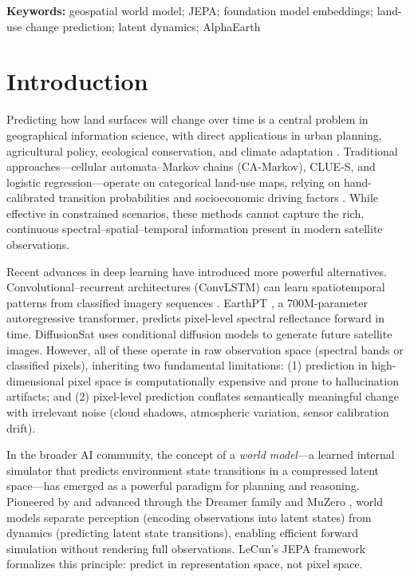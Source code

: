 \documentclass{article}
\newenvironment{keywords}{\par\noindent\textbf{Keywords:} }{\par}
\begin{document}
\begin{keywords}
geospatial world model; JEPA; foundation model embeddings; land-use change prediction; latent dynamics; AlphaEarth
\end{keywords}

\section{Introduction}
\label{sec:intro}

Predicting how land surfaces will change over time is a central problem in geographical information science, with direct applications in urban planning, agricultural policy, ecological conservation, and climate adaptation \citep{verburg2004lulc}. Traditional approaches---cellular automata--Markov chains (CA-Markov), CLUE-S, and logistic regression---operate on categorical land-use maps, relying on hand-calibrated transition probabilities and socioeconomic driving factors \citep{veldkamp2004clues}. While effective in constrained scenarios, these methods cannot capture the rich, continuous spectral--spatial--temporal information present in modern satellite observations.

Recent advances in deep learning have introduced more powerful alternatives. Convolutional--recurrent architectures (ConvLSTM) can learn spatiotemporal patterns from classified imagery sequences \citep{shi2015convlstm}. EarthPT \citep{smith2023earthpt}, a 700M-parameter autoregressive transformer, predicts pixel-level spectral reflectance forward in time. DiffusionSat \citep{khanna2023diffusionsat} uses conditional diffusion models to generate future satellite images. However, all of these operate in raw observation space (spectral bands or classified pixels), inheriting two fundamental limitations: (1) prediction in high-dimensional pixel space is computationally expensive and prone to hallucination artifacts; and (2) pixel-level prediction conflates semantically meaningful change with irrelevant noise (cloud shadows, atmospheric variation, sensor calibration drift).

In the broader AI community, the concept of a \textit{world model}---a learned internal simulator that predicts environment state transitions in a compressed latent space---has emerged as a powerful paradigm for planning and reasoning. Pioneered by \citet{ha2018world} and advanced through the Dreamer family \citep{hafner2023dreamerv3} and MuZero \citep{schrittwieser2020muzero}, world models separate perception (encoding observations into latent states) from dynamics (predicting latent state transitions), enabling efficient forward simulation without rendering full observations. LeCun's JEPA framework \citep{lecun2022jepa} formalizes this principle: predict in representation space, not pixel space.
\end{document}
